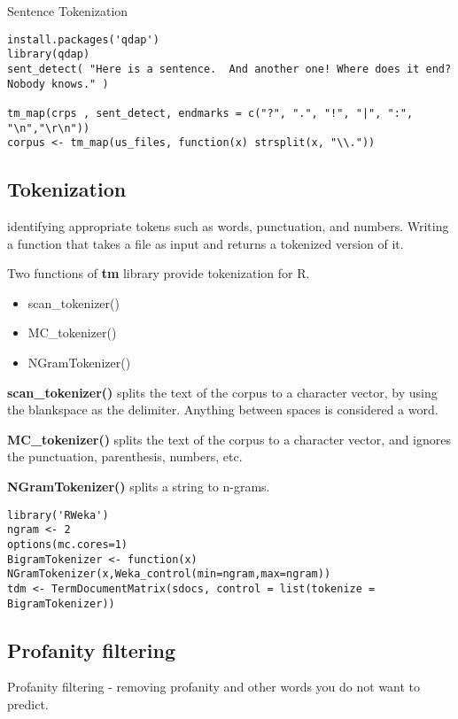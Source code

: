 \documentclass{article}
\begin{document}
Sentence Tokenization

\begin{lstlisting}
install.packages('qdap')
library(qdap)
sent_detect( "Here is a sentence.  And another one! Where does it end? Nobody knows." )

tm_map(crps , sent_detect, endmarks = c("?", ".", "!", "|", ":", "\n","\r\n"))
corpus <- tm_map(us_files, function(x) strsplit(x, "\\."))

\end{lstlisting}


\subsection{Tokenization}

identifying appropriate tokens such as words, punctuation, and numbers. Writing a function that takes a file as input and returns a tokenized version of it.

Two functions of \textbf{tm} library provide tokenization for R.

\begin{itemize}
\item scan\_tokenizer()
\item MC\_tokenizer()
\item NGramTokenizer()
\end{itemize}

\textbf{scan\_tokenizer()} splits the text of the corpus to a character vector, by using the blankspace as the delimiter. Anything between spaces is considered a word.

\textbf{MC\_tokenizer()} splits the text of the corpus to a character vector, and ignores the punctuation, parenthesis, numbers, etc.

\textbf{NGramTokenizer()} splits a string to n-grams.

\begin{lstlisting}
library('RWeka')
ngram <- 2
options(mc.cores=1)
BigramTokenizer <- function(x) NGramTokenizer(x,Weka_control(min=ngram,max=ngram))
tdm <- TermDocumentMatrix(sdocs, control = list(tokenize = BigramTokenizer))
\end{lstlisting}

\subsection{Profanity filtering}

Profanity filtering - removing profanity and other words you do not want to predict.
\end{document}
